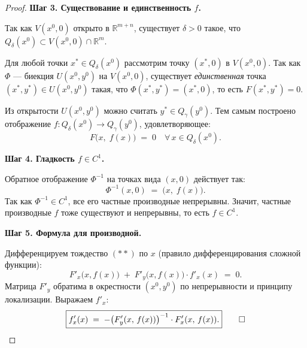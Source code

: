 \begin{proof}
  \bigskip
  \textbf{Шаг 3. Существование и единственность $f$.}

  Так как $V(x^0, 0)$ открыто в $\mathbb{R}^{m+n}$, существует $\delta > 0$
  такое, что $Q_\delta(x^0) \subset V(x^0, 0) \cap \mathbb{R}^m$.

  Для любой точки $x^* \in Q_\delta(x^0)$ рассмотрим точку $(x^*, 0)$
  в $V(x^0, 0)$. Так как $\Phi$ --- биекция $U(x^0,y^0)$ на $V(x^0,0)$,
  существует \emph{единственная} точка $(x^*, y^*) \in U(x^0, y^0)$ такая,
  что $\Phi(x^*, y^*) = (x^*, 0)$, то есть $F(x^*, y^*) = 0$.

  Из открытости $U(x^0, y^0)$ можно считать $y^* \in Q_\gamma(y^0)$.
  Тем самым построено отображение $f : Q_\delta(x^0) \to Q_\gamma(y^0)$,
  удовлетворяющее:
  \[
    F\bigl(x,\; f(x)\bigr) \;=\; 0
    \quad \forall\, x \in Q_\delta(x^0). \tag{$**$}
  \]

  \bigskip
  \textbf{Шаг 4. Гладкость $f \in C^1$.}

  Обратное отображение $\Phi^{-1}$ на точках вида $(x, 0)$ действует так:
  \[
    \Phi^{-1}(x, 0) \;=\; \bigl(x,\; f(x)\bigr).
  \]
  Так как $\Phi^{-1} \in C^1$, все его частные производные непрерывны.
  Значит, частные производные $f$ тоже существуют и непрерывны,
  то есть $f \in C^1$.

  \bigskip
  \textbf{Шаг 5. Формула для производной.}

  Дифференцируем тождество $(**)$ по $x$ (правило дифференцирования
  сложной функции):
  \[
    F'_x\bigl(x, f(x)\bigr)
    \;+\;
    F'_y\bigl(x, f(x)\bigr) \cdot f'_x(x)
    \;=\; 0.
  \]
  Матрица $F'_y$ обратима в окрестности $(x^0,y^0)$ по непрерывности
  и принципу локализации. Выражаем $f'_x$:
  \[
    \boxed{
      f'_x(x)
      \;=\;
      -\bigl(F'_y(x,\, f(x))\bigr)^{-1}
      \cdot F'_x(x,\, f(x)).
    }
    \qed
  \]
\end{proof}


